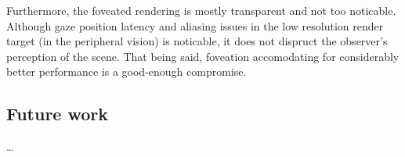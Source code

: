 Furthermore, the foveated rendering is mostly transparent and not too noticable.
Although gaze position latency and aliasing issues in the low resolution render target (in the peripheral vision) is noticable, it does not dispruct the observer's perception of the scene.
That being said, foveation accomodating for considerably better performance is a good-enough compromise.

\subsection{Future work}
\ldots

